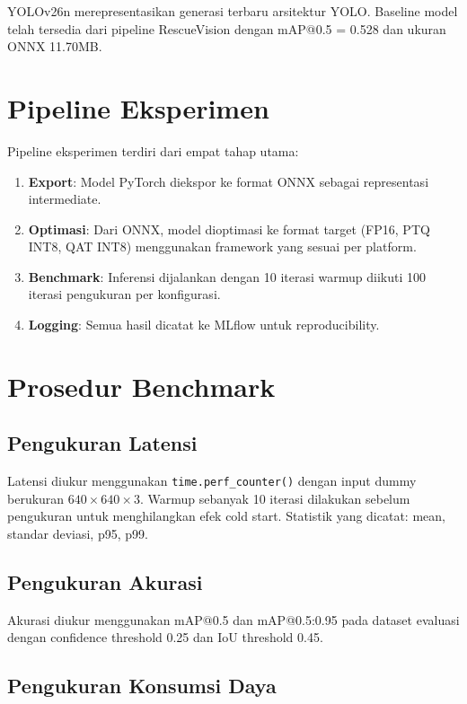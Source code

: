 \documentclass[12pt, a4paper]{report}
\begin{document}
YOLOv26n merepresentasikan generasi terbaru arsitektur YOLO.
Baseline model telah tersedia dari pipeline RescueVision dengan
mAP@0.5 = 0.528 dan ukuran ONNX 11.70MB.

\section{Pipeline Eksperimen}

Pipeline eksperimen terdiri dari empat tahap utama:
\begin{enumerate}
  \item \textbf{Export}: Model PyTorch diekspor ke format ONNX sebagai representasi intermediate.
  \item \textbf{Optimasi}: Dari ONNX, model dioptimasi ke format target
    (FP16, PTQ INT8, QAT INT8) menggunakan framework yang sesuai per platform.
  \item \textbf{Benchmark}: Inferensi dijalankan dengan 10 iterasi warmup
    diikuti 100 iterasi pengukuran per konfigurasi.
  \item \textbf{Logging}: Semua hasil dicatat ke MLflow untuk reproducibility.
\end{enumerate}

\section{Prosedur Benchmark}

\subsection{Pengukuran Latensi}

Latensi diukur menggunakan \texttt{time.perf\_counter()} dengan input dummy
berukuran $640 \times 640 \times 3$. Warmup sebanyak 10 iterasi dilakukan
sebelum pengukuran untuk menghilangkan efek cold start.
Statistik yang dicatat: mean, standar deviasi, p95, p99.

\subsection{Pengukuran Akurasi}

Akurasi diukur menggunakan mAP@0.5 dan mAP@0.5:0.95 pada dataset evaluasi
dengan confidence threshold 0.25 dan IoU threshold 0.45.

\subsection{Pengukuran Konsumsi Daya}
\end{document}

